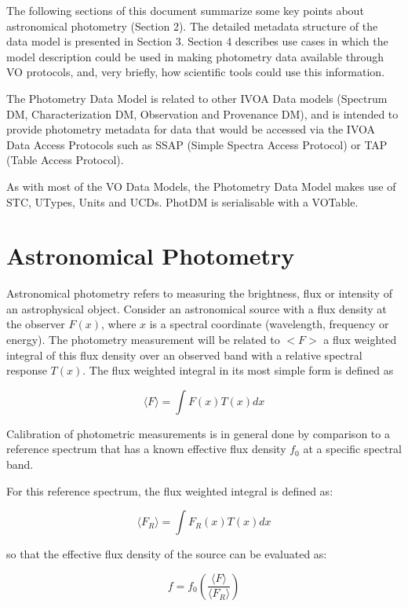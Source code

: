 \documentclass[11pt,a4paper]{ivoa}
\begin{document}
The following sections of this document summarize some key points
about astronomical photometry (Section 2). The detailed metadata
structure of the data model is presented in Section 3. Section 4
describes use cases in which the model description could be used in
making photometry data available through VO protocols, and, very briefly,
how scientific tools could use this information.


The Photometry Data Model is related to other IVOA Data models (Spectrum DM, Characterization DM,
Observation and Provenance DM),  and is intended to provide photometry
metadata for data that would be accessed via the IVOA Data Access Protocols
such as SSAP (Simple Spectra Access Protocol) or TAP (Table Access Protocol).

As with most of the VO Data Models, the Photometry Data Model makes use of STC, UTypes, Units
and UCDs. PhotDM is serialisable with a VOTable.

\section{Astronomical Photometry}
Astronomical photometry refers to measuring the brightness, flux or
intensity of an astrophysical object. Consider an astronomical source
with a flux density at the observer $F(x)$, where $x$ is a spectral coordinate
(wavelength, frequency or energy).  The photometry measurement will be related
to $<F>$ a flux weighted integral of this flux density over an observed band
with a relative spectral response $T(x)$. The flux weighted integral in its most
simple form is defined as


\begin{equation} \label{eq:1}
\langle F\rangle = \int F(x)T(x)dx
\end{equation}

Calibration of photometric measurements is in general done by comparison to a
reference spectrum that has a known effective flux density $f_0$ at a specific
spectral band.


For this reference spectrum, the flux weighted integral is defined as:

\begin{equation} \label{eq:2}
\langle F_R \rangle= \int F_R (x)T(x)dx
\end{equation}


so that the effective flux density of the source can be evaluated as:

\begin{equation} \label{eq:3}
f = f_0 ( \frac{\langle F\rangle }{\langle F_R \rangle } )
\end{equation}
\end{document}
